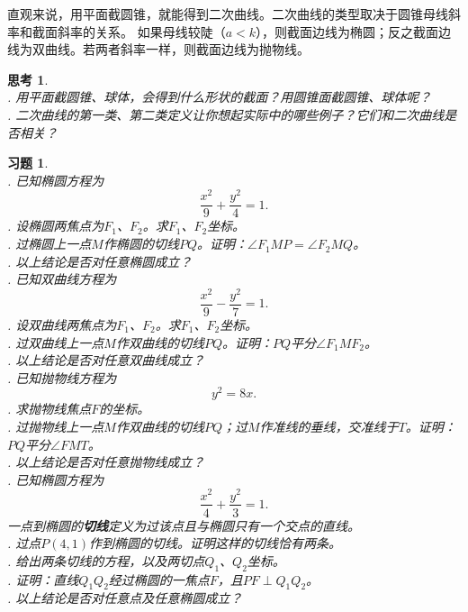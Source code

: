 \documentclass[12pt,UTF8]{ctexbook}
\theoremstyle{definition}
\theoremstyle{plain}
\newtheorem{sk}{思考}[section]
\newtheorem{xt}{习题}[section]
\begin{document}

直观来说，用平面截圆锥，就能得到二次曲线。二次曲线的类型取决于圆锥母线斜率和截面斜率的关系。
如果母线较陡（$a<k$），则截面边线为椭圆；反之截面边线为双曲线。若两者斜率一样，则截面边线为抛物线。

\begin{sk}
    \mbox{} \\
    . 用平面截圆锥、球体，会得到什么形状的截面？用圆锥面截圆锥、球体呢？\\
    . 二次曲线的第一类、第二类定义让你想起实际中的哪些例子？它们和二次曲线是否相关？
\end{sk}

\begin{xt}
    \mbox{} \\
    . 已知椭圆方程为
    $$ \frac{x^2}{9} + \frac{y^2}{4} = 1.$$
    . 设椭圆两焦点为$F_1$、$F_2$。求$F_1$、$F_2$坐标。\\
    . 过椭圆上一点$M$作椭圆的切线$PQ$。证明：$\angle F_1MP = \angle F_2MQ$。\\
    . 以上结论是否对任意椭圆成立？\\
    . 已知双曲线方程为
    $$ \frac{x^2}{9} - \frac{y^2}{7} = 1.$$
    . 设双曲线两焦点为$F_1$、$F_2$。求$F_1$、$F_2$坐标。\\
    . 过双曲线上一点$M$作双曲线的切线$PQ$。证明：$PQ$平分$\angle F_1MF_2$。\\
    . 以上结论是否对任意双曲线成立？\\
    . 已知抛物线方程为
    $$ y^2 = 8x.$$
    . 求抛物线焦点$F$的坐标。\\
    . 过抛物线上一点$M$作双曲线的切线$PQ$；过$M$作准线的垂线，交准线于$T$。证明：$PQ$平分$\angle FMT$。\\
    . 以上结论是否对任意抛物线成立？\\
    . 已知椭圆方程为
    $$ \frac{x^2}{4} + \frac{y^2}{3} = 1.$$
    一点到椭圆的\textbf{切线}定义为过该点且与椭圆只有一个交点的直线。\\
    . 过点$P(4, 1)$作到椭圆的切线。证明这样的切线恰有两条。\\
    . 给出两条切线的方程，以及两切点$Q_1$、$Q_2$坐标。\\
    . 证明：直线$Q_1Q_2$经过椭圆的一焦点$F$，且$PF\perp Q_1Q_2$。\\
    . 以上结论是否对任意点及任意椭圆成立？\\

\end{xt}
\end{document}
